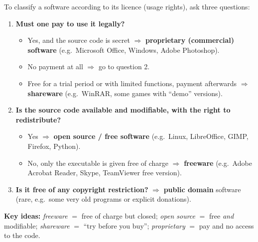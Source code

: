 \documentclass[11pt]{article}
\newcommand{\cle}[1]{{\popxbold\color{popdark}#1}}
\begin{document}
\begin{methode}
To classify a software according to its \cle{licence} (usage rights), ask three questions:
\begin{enumerate}
\item \textbf{Must one pay to use it legally?}
\begin{itemize}
\item Yes, and the source code is secret $\Rightarrow$ \textbf{proprietary (commercial) software} (e.g.\ Microsoft Office, Windows, Adobe Photoshop).
\item No payment at all $\Rightarrow$ go to question 2.
\item Free for a trial period or with limited functions, payment afterwards $\Rightarrow$ \textbf{shareware} (e.g.\ WinRAR, some games with ``demo'' versions).
\end{itemize}
\item \textbf{Is the source code available and modifiable, with the right to redistribute?}
\begin{itemize}
\item Yes $\Rightarrow$ \textbf{open source / free software} (e.g.\ Linux, LibreOffice, GIMP, Firefox, Python).
\item No, only the executable is given free of charge $\Rightarrow$ \textbf{freeware} (e.g.\ Adobe Acrobat Reader, Skype, TeamViewer free version).
\end{itemize}
\item \textbf{Is it free of any copyright restriction?} $\Rightarrow$ \textbf{public domain} software (rare, e.g.\ some very old programs or explicit donations).
\end{enumerate}
\textbf{Key ideas:} \emph{freeware} $=$ free of charge but closed; \emph{open source} $=$ free \emph{and} modifiable; \emph{shareware} $=$ ``try before you buy''; \emph{proprietary} $=$ pay and no access to the code.
\end{methode}
\end{document}
